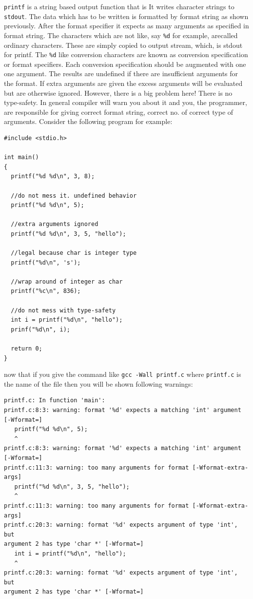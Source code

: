 \texttt{printf} is a string based output function that is It writes character
strings to \texttt{stdout}. The data which has to be written is formatted by
format string as shown previously. After the format specifier it expects as
many arguments as specified in format string. The characters which are not
like, say \texttt{\%d} for example, arecalled ordinary characters. These are
simply copied to output stream, which, is stdout for printf. The \texttt{\%d}
like conversion characters are known as conversion specification or format
specifiers. Each conversion specification should be augmented with one one
argument. The results are undefined if there are insufficient arguments for the
format. If extra arguments are given the excess arguments will be evaluated but
are otherwise ignored. However, there is a big problem here! There is no
type-safety. In general compiler will warn you about it and you, the
programmer, are responsible for giving correct format string, correct no. of
correct type of arguments. Consider the following program for example:

\begin{Verbatim}[frame=single]
#include <stdio.h>

int main()
{
  printf("%d %d\n", 3, 8);

  //do not mess it. undefined behavior
  printf("%d %d\n", 5);

  //extra arguments ignored
  printf("%d %d\n", 3, 5, "hello");

  //legal because char is integer type
  printf("%d\n", 's');

  //wrap around of integer as char
  printf("%c\n", 836);

  //do not mess with type-safety
  int i = printf("%d\n", "hello");
  prinf("%d\n", i);

  return 0;
}
\end{Verbatim}

now that if you give the command like \texttt{gcc -Wall printf.c} where
\texttt{printf.c} is the name of the file then you will be shown following
warnings:

\begin{Verbatim}[frame=single]
printf.c: In function 'main':
printf.c:8:3: warning: format '%d' expects a matching 'int' argument [-Wformat=]
   printf("%d %d\n", 5);
   ^
printf.c:8:3: warning: format '%d' expects a matching 'int' argument [-Wformat=]
printf.c:11:3: warning: too many arguments for format [-Wformat-extra-args]
   printf("%d %d\n", 3, 5, "hello");
   ^
printf.c:11:3: warning: too many arguments for format [-Wformat-extra-args]
printf.c:20:3: warning: format '%d' expects argument of type 'int', but
argument 2 has type 'char *' [-Wformat=]
   int i = printf("%d\n", "hello");
   ^
printf.c:20:3: warning: format '%d' expects argument of type 'int', but
argument 2 has type 'char *' [-Wformat=]
\end{Verbatim}

